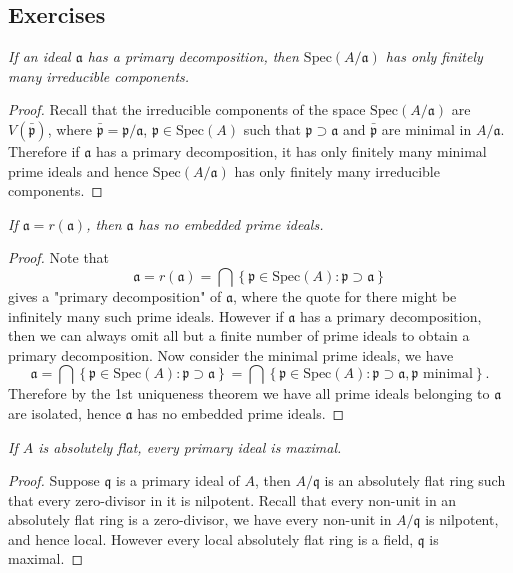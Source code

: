 \subsection{Exercises}
\begin{problem}\em
If an ideal $\mathfrak{a}$ has a primary decomposition, then $\mathrm{Spec}(A/\mathfrak{a})$ has only finitely many irreducible components.
\end{problem}
\begin{proof}
Recall that the irreducible components of the space $\mathrm{Spec}(A/\mathfrak{a})$ are $V(\bar{\mathfrak{p}})$, where $\bar{\mathfrak{p}}=\mathfrak{p}/\mathfrak{a}$, $\mathfrak{p}\in\mathrm{Spec}(A)$ such that $\mathfrak{p}\supset\mathfrak{a}$ and $\bar{\mathfrak{p}}$ are minimal in $A/\mathfrak{a}$. Therefore if $\mathfrak{a}$ has a primary decomposition, it has only finitely many minimal prime ideals and hence $\mathrm{Spec}(A/\mathfrak{a})$ has only finitely many irreducible components.
\end{proof}
\begin{problem}\em
If $\mathfrak{a}=r(\mathfrak{a})$, then $\mathfrak{a}$ has no embedded prime ideals.
\end{problem}
\begin{proof}
Note that 
$$
\mathfrak{a} =r\left( \mathfrak{a} \right) =\bigcap{\left\{ \mathfrak{p} \in \mathrm{Spec}\left( A \right) :\mathfrak{p} \supset \mathfrak{a} \right\}}
$$
gives a "primary decomposition" of $\mathfrak{a}$, where the quote for there might be infinitely many such prime ideals. However if $\mathfrak{a}$ has a primary decomposition, then we can always omit all but a finite number of prime ideals to obtain a primary decomposition. Now consider the minimal prime ideals, we have 
$$
\mathfrak{a} =\bigcap{\left\{ \mathfrak{p} \in \mathrm{Spec}\left( A \right) :\mathfrak{p} \supset \mathfrak{a} \right\}}=\bigcap{\left\{ \mathfrak{p} \in \mathrm{Spec}\left( A \right) :\mathfrak{p} \supset \mathfrak{a} ,\mathfrak{p}\text{ minimal} \right\}}.
$$
Therefore by the 1st uniqueness theorem we have all prime ideals belonging to $\mathfrak{a}$ are isolated, hence $\mathfrak{a}$ has no embedded prime ideals.
\end{proof}
\begin{problem}\em
If $A$ is absolutely flat, every primary ideal is maximal.
\end{problem}
\begin{proof}
Suppose $\mathfrak{q}$ is a primary ideal of $A$, then $A/\mathfrak{q}$ is an absolutely flat ring such that every zero-divisor in it is nilpotent. Recall that every non-unit in an absolutely flat ring is a zero-divisor, we have every non-unit in $A/\mathfrak{q}$ is nilpotent, and hence local. However every local absolutely flat ring is a field, $\mathfrak{q}$ is maximal.
\end{proof}
